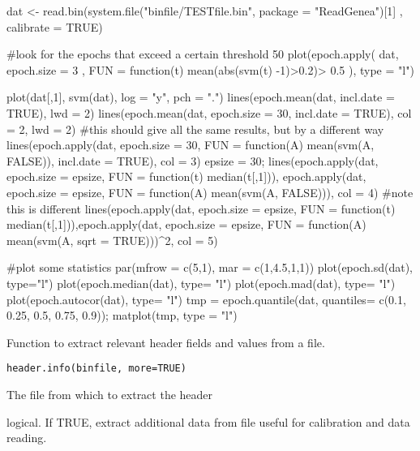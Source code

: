\documentclass[a4paper]{book}
\begin{document}
%
\begin{Examples}
\begin{ExampleCode}

dat <- read.bin(system.file("binfile/TESTfile.bin", package = "ReadGenea")[1]
    , calibrate = TRUE)

#look for the epochs that exceed a certain threshold 50%
plot(epoch.apply( dat, epoch.size = 3 , 
    FUN = function(t) mean(abs(svm(t) -1)>0.2)> 0.5 ), type = "l")

plot(dat[,1], svm(dat), log = "y", pch = ".")
lines(epoch.mean(dat, incl.date = TRUE), lwd = 2)
lines(epoch.mean(dat, epoch.size = 30, incl.date = TRUE), col = 2, lwd = 2)
#this should give all the same results, but by a different way
lines(epoch.apply(dat, epoch.size = 30, 
    FUN = function(A) mean(svm(A, FALSE)), incl.date = TRUE), col = 3)
epsize = 30; lines(epoch.apply(dat, epoch.size = epsize, 
    FUN = function(t) median(t[,1])), epoch.apply(dat, epoch.size = epsize, 
    FUN = function(A) mean(svm(A, FALSE))), col = 4)
#note this is different
lines(epoch.apply(dat, epoch.size = epsize, 
    FUN = function(t) median(t[,1])),epoch.apply(dat, epoch.size = epsize, 
    FUN = function(A) mean(svm(A, sqrt = TRUE)))^2, col = 5)

#plot some statistics
par(mfrow = c(5,1), mar = c(1,4.5,1,1))
plot(epoch.sd(dat), type="l")
plot(epoch.median(dat), type= "l")
plot(epoch.mad(dat), type= "l")
plot(epoch.autocor(dat), type= "l")
tmp = epoch.quantile(dat, quantiles= c(0.1, 0.25, 0.5, 0.75, 0.9)); matplot(tmp, type = "l")


\end{ExampleCode}
\end{Examples}
%
\begin{Description}\relax
Function to extract relevant header fields and values from a file.
\end{Description}
%
\begin{Usage}
\begin{verbatim}
header.info(binfile, more=TRUE)
\end{verbatim}
\end{Usage}
%
\begin{Arguments}
\begin{ldescription}
\item[\code{binfile}] The file from which to extract the header
\item[\code{more}] logical. If TRUE, extract additional data from file useful for calibration and data reading.
\end{ldescription}
\end{Arguments}
\end{document}
